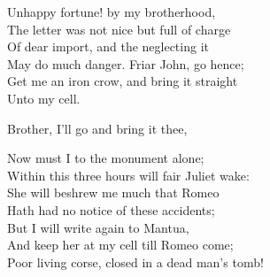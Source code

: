 \begin{speech}
Unhappy fortune! by my brotherhood, \\
The letter was not nice but full of charge \\
Of dear import, and the neglecting it \\
May do much danger. Friar John, go hence; \\
Get me an iron crow, and bring it straight \\
Unto my cell. \\
\end{speech}
\begin{speech}
Brother, I'll go and bring it thee, 
\\
\end{speech}
\begin{speech}
Now must I to the monument alone; \\
Within this three hours will fair Juliet wake: \\
She will beshrew me much that Romeo \\
Hath had no notice of these accidents; \\
But I will write again to Mantua, \\
And keep her at my cell till Romeo come; \\
Poor living corse, closed in a dead man's tomb!  \\
\end{speech}


